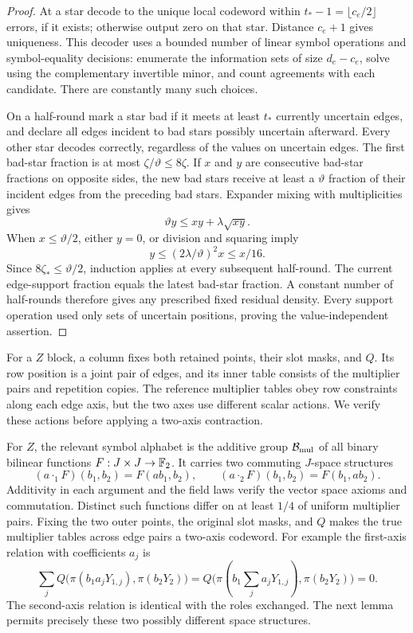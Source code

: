 \begin{proof}
At a star decode to the unique local codeword within
\(t_*-1=\lfloor c_e/2\rfloor\) errors, if it exists; otherwise
output zero on that star.  Distance \(c_e+1\) gives uniqueness.
This decoder uses a bounded number of linear symbol operations and
symbol-equality decisions: enumerate the information sets of size
\(d_e-c_e\), solve using the complementary invertible minor,
and count agreements with each candidate.  There are constantly
many such choices.

On a half-round mark a star bad if it meets at least \(t_*\)
currently uncertain edges, and declare all edges incident to bad
stars possibly uncertain afterward.  Every other star decodes
correctly, regardless of the values on uncertain edges.  The first
bad-star fraction is at most \(\zeta/\vartheta\le8\zeta\).
If \(x\) and \(y\) are consecutive bad-star fractions on opposite
sides, the new bad stars receive at least a \(\vartheta\) fraction
of their incident edges from the preceding bad stars.  Expander
mixing with multiplicities gives
\begin{equation}
 \vartheta y\le xy+\lambda\sqrt{xy}.
 \label{ib:mixing-contraction}
\end{equation}
When \(x\le\vartheta/2\), either \(y=0\), or division and
squaring imply
\[
 y\le(2\lambda/\vartheta)^2x\le x/16.
\]
Since \(8\zeta_*\le\vartheta/2\), induction applies at every
subsequent half-round.  The current edge-support fraction equals
the latest bad-star fraction.  A constant number of half-rounds
therefore gives any prescribed fixed residual density.  Every
support operation used only sets of uncertain positions, proving
the value-independent assertion.
\end{proof}

For a \(Z\) block, a column fixes both retained points, their slot
masks, and \(Q\). Its row position is a joint pair of edges, and its
inner table consists of the multiplier pairs and repetition copies.
The reference multiplier tables obey row constraints along each edge
axis, but the two axes use different scalar actions. We verify these
actions before applying a two-axis contraction.

For \(Z\), the relevant symbol alphabet is the additive group
\(\mathcal B_{\rm mul}\) of all binary bilinear functions
\(F:J\times J\to\mathbb{F}_2\).  It carries two commuting \(J\)-space
structures
\begin{equation}
 (a\cdot_1F)(b_1,b_2)=F(ab_1,b_2),\qquad
 (a\cdot_2F)(b_1,b_2)=F(b_1,ab_2).
 \label{ib:two-actions}
\end{equation}
Additivity in each argument and the field laws verify the vector
space axioms and commutation.  Distinct such functions differ on
at least \(1/4\) of uniform multiplier pairs.  Fixing the two
outer points, the original slot masks, and \(Q\) makes the true
multiplier tables across edge pairs a two-axis codeword.  For
example the first-axis relation with coefficients \(a_j\) is
\[
 \sum_j Q\bigl(\pi(b_1a_jY_{1,j}),\pi(b_2Y_2)\bigr)
 =Q\bigl(\pi(b_1\sum_j a_jY_{1,j}),\pi(b_2Y_2)\bigr)=0.
\]
The second-axis relation is identical with the roles exchanged.
The next lemma permits precisely these two possibly different space
structures.

